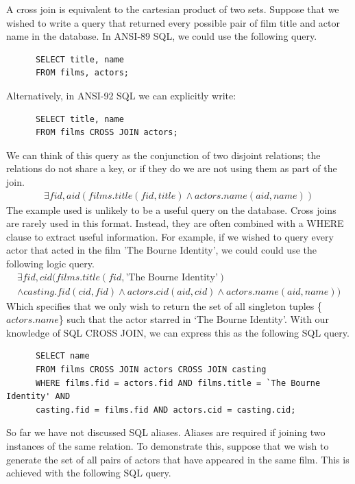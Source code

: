 \documentclass[a4paper, 11pt]{article}
\begin{document}
      A cross join is equivalent to the cartesian product of two sets. Suppose
      that we wished to write a query that returned every possible pair of
      film title and actor name in the database. In ANSI-89 SQL, we could use 
      the following query.
      \begin{verbatim}
      SELECT title, name
      FROM films, actors;
      \end{verbatim}
      Alternatively, in ANSI-92 SQL we can explicitly write:
      \begin{verbatim}
      SELECT title, name
      FROM films CROSS JOIN actors;
      \end{verbatim}
      We can think of this query as the conjunction of two disjoint relations;
      the relations do not share a key, or if they do we are not using them as
      part of the join.
      \begin{gather}
        \exists fid, aid(films.title(fid, title) \land actors.name(aid, name))
      \end{gather}
      The example used is unlikely to be a useful query on the database. Cross
      joins are rarely used in this format. Instead, they are often combined
      with a WHERE clause to extract useful information. For example, if we
      wished to query every actor that acted in the film 'The Bourne Identity',
      we could could use the following logic query.
      \begin{multline}
        \exists fid,cid(films.title(fid, \text{'The Bourne Identity'}) \\
        \land casting.fid(cid, fid) \land actors.cid(aid, cid) \land actors.name(aid, name))
      \end{multline}
      Which specifies that we only wish to return the set of all singleton
      tuples \{$actors.name$\} such that the actor starred in `The Bourne Identity'.
      With our knowledge of SQL CROSS JOIN, we can express this as the
      following SQL query.
      \begin{verbatim}
      SELECT name
      FROM films CROSS JOIN actors CROSS JOIN casting
      WHERE films.fid = actors.fid AND films.title = `The Bourne Identity' AND
      casting.fid = films.fid AND actors.cid = casting.cid;
      \end{verbatim}
      So far we have not discussed SQL aliases. Aliases are required if joining
      two instances of the same relation. To demonstrate this, suppose that we
      wish to generate the set of all pairs of actors that have appeared in the
      same film. This is achieved with the following SQL query.
\end{document}
